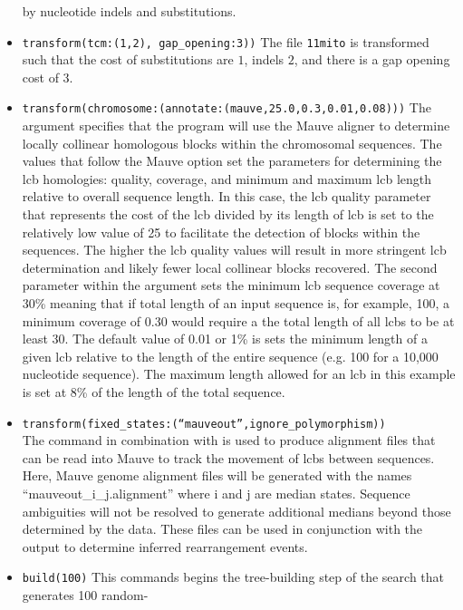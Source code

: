 \begin{itemize}
by nucleotide indels and substitutions.  
\item \texttt{transform(tcm:(1,2), gap\_opening:3))} The file \texttt{11mito} is transformed such that the cost of substitutions 
are $1$, indels $2$, and there is a gap opening cost of $3$.
\item \texttt{transform(chromosome:(annotate:(mauve,25.0,0.3,0.01,0.08)))} The argument  
specifies that the program will use the Mauve aligner \cite{darlingetal2004} to determine locally collinear 
homologous blocks within the chromosomal sequences.  The values that follow the Mauve option set the parameters 
for determining the lcb homologies: quality, coverage, and minimum and maximum lcb length relative to overall 
sequence length. In this case, the lcb quality parameter that represents the cost of the lcb divided by its length of lcb 
is set to the relatively low value of 25 to facilitate the detection of blocks within the sequences.  The higher the lcb 
quality values will result in more stringent lcb determination and likely fewer local collinear blocks recovered.  The 
second parameter within the argument  sets the minimum lcb sequence coverage at 
30\% meaning that if total length of an input sequence is, for example, 100, a minimum coverage of 0.30 would require 
a the total length of all lcbs to be at least 30. The default value of 0.01 or 1\% is sets the minimum length of a given lcb 
relative to the length of the entire sequence (e.g. 100 for a 10,000 nucleotide sequence). The maximum length 
allowed for an lcb in this example is set at 8\% of the length of the total sequence.
\item \texttt{transform(fixed\_states:(``mauveout'',ignore\_polymorphism))}  \\The {} command 
in combination with  is used to produce alignment files that 
can be read into Mauve to track the movement of lcbs between sequences. Here, Mauve genome alignment files will be generated 
with the names ``mauveout\_i\_j.alignment'' where i and j are median states. Sequence ambiguities will not be resolved to generate additional 
medians beyond those determined by the data. These files can be used in conjunction with the  output to
determine inferred rearrangement events. 
\item \texttt{build(100)} This commands begins the tree-building step of the search that generates 100 random-

\end{itemize}
